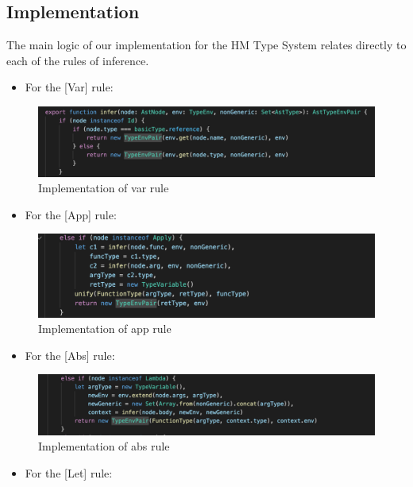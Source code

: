 \subsection{Implementation}
The main logic of our implementation for the HM Type System relates directly to each of the rules of inference.
  \begin{itemize}
    \item For the [Var] rule:
  \end{itemize}
  \begin{figure}[H]
      \centering
      \includegraphics[width=0.8\linewidth]{images/var.png}
      \caption{Implementation of var rule}
      \label{fig:varrule}
  \end{figure}
  \begin{itemize}
    \item For the [App] rule:
  \end{itemize}
  \begin{figure}[H]
      \centering
      \includegraphics[width=0.8\linewidth]{images/app.png}
      \caption{Implementation of app rule}
      \label{fig:apprule}
  \end{figure}
  \begin{itemize}
    \item For the [Abs] rule:
  \end{itemize}
  \begin{figure}[H]
      \centering
      \includegraphics[width=0.8\linewidth]{images/abs.png}
      \caption{Implementation of abs rule}
      \label{fig:absrule}
  \end{figure}
  \begin{itemize}
    \item For the [Let] rule:
  \end{itemize}
